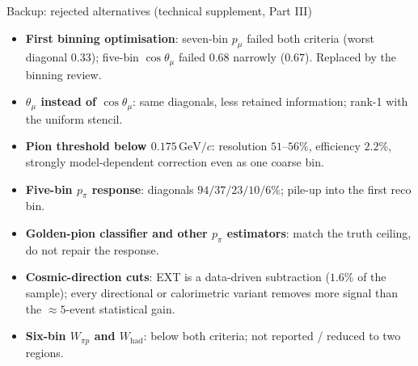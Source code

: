 \documentclass[aspectratio=169,10pt]{beamer}
\newcommand{\GeVc}{\,\text{GeV}/c}
\begin{document}
\begin{frame}{Backup: rejected alternatives (technical supplement, Part III)}
  \small
  \begin{itemize}\setlength\itemsep{4pt}
    \item \textbf{First binning optimisation}: seven-bin $p_\mu$ failed both criteria (worst diagonal $0.33$);
      five-bin $\cos\theta_\mu$ failed $0.68$ narrowly ($0.67$). Replaced by the binning review.
    \item \textbf{$\theta_\mu$ instead of $\cos\theta_\mu$}: same diagonals, less retained information; rank-1 with the uniform stencil.
    \item \textbf{Pion threshold below $0.175\GeVc$}: resolution $51$--$56\%$, efficiency $2.2\%$, strongly
      model-dependent correction even as one coarse bin.
    \item \textbf{Five-bin $p_\pi$ response}: diagonals $94/37/23/10/6\%$; pile-up into the first reco bin.
    \item \textbf{Golden-pion classifier and other $p_\pi$ estimators}: match the truth ceiling, do not repair the response.
    \item \textbf{Cosmic-direction cuts}: EXT is a data-driven subtraction ($1.6\%$ of the sample); every
      directional or calorimetric variant removes more signal than the $\approx5$-event statistical gain.
    \item \textbf{Six-bin $W_{\pi p}$ and $W_\mathrm{had}$}: below both criteria; not reported / reduced to two regions.
  \end{itemize}
\end{frame}
\end{document}
